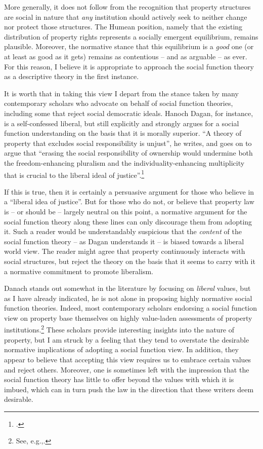 More generally, it does not follow from the recognition that property structures are social in nature that {\it any} institution should actively seek to neither change nor protect those structures. The Humean position, namely that the existing distribution of property rights represents a socially emergent equilibrium, remains plausible. Moreover, the normative stance that this equilibrium is a {\it good} one (or at least as good as it gets) remains as contentious -- and as arguable -- as ever. For this reason, I believe it is appropriate to approach the social function theory as a descriptive theory in the first instance.

It is worth  that in taking this view I depart from the stance taken by many  contemporary scholars who advocate on behalf of social function theories, including some that reject social democratic ideals. Hanoch Dagan, for instance, is a self-confessed liberal, but still explicitly and strongly argues for a social function understanding on the basis that it is morally superior. ``A theory of property that excludes social responsibility is unjust'', he writes, and goes on to argue that ``erasing the social responsibility of ownership would undermine both the freedom-enhancing pluralism and the individuality-enhancing multiplicity that is crucial to the liberal ideal of justice''.\footcite[1259]{dagan07}

If this is true, then it is certainly a persuasive argument for those who believe in a ``liberal idea of justice''. But for those who do not, or believe that property law is -- or should be -- largely neutral on this point, a normative argument for the social function theory along these lines can only discourage them from adopting it. Such a reader would be understandably suspicious that the {\it content} of the social function theory -- as Dagan understands it -- is biased towards a liberal world view. The reader might agree that property continuously interacts with social structures, but reject the theory on the basis that it seems to carry with it a normative commitment to promote liberalism.

Danach stands out somewhat in the literature by focusing on {\it liberal} values, but as I have already indicated, he is not alone in proposing highly normative social function theories. Indeed, most contemporary scholars endorsing a social function view on property base themselves on highly value-laden assessments of property institutions.\footnote{See, e.g.,\cite{alexander09,crawford11,davidson11,singer09,penalver09}.} These scholars provide interesting insights into the nature of property, but I am struck by a feeling that they tend to overstate the desirable normative implications of adopting a social function view. In addition, they appear to believe that accepting this view requires us to embrace certain values and reject others. Moreover, one is sometimes left with the impression that the social function theory has little to offer beyond the values with which it is imbued, which can in turn push the law in the direction that these writers deem desirable. 

